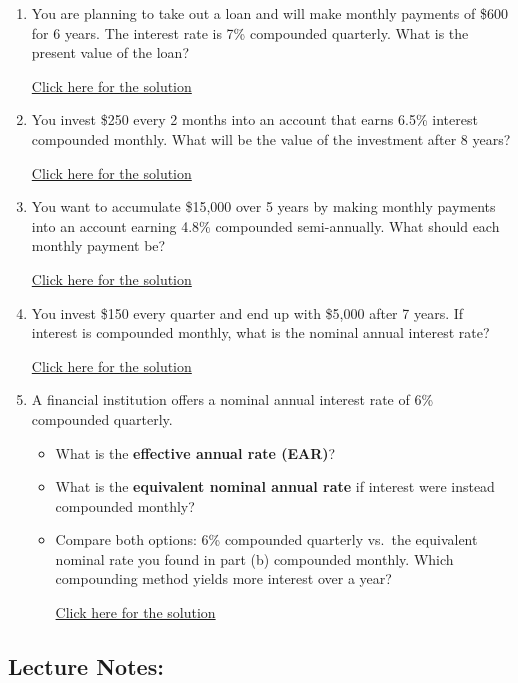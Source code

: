 \documentclass[
]{book}
\providecommand{\tightlist}{%
  \setlength{\itemsep}{0pt}\setlength{\parskip}{0pt}}
\begin{document}
\begin{enumerate}
\def\labelenumi{\arabic{enumi}.}
\tightlist
\item
  You are planning to take out a loan and will make monthly payments of \$600 for 6 years. The interest rate is 7\% compounded quarterly. What is the present value of the loan?

  \href{https://youtu.be/LudOJKtJSTU}{Click here for the solution}
\item
  You invest \$250 every 2 months into an account that earns 6.5\% interest compounded monthly. What will be the value of the investment after 8 years?

  \href{https://youtu.be/rjgtfe-PjDs}{Click here for the solution}
\item
  You want to accumulate \$15,000 over 5 years by making monthly payments into an account earning 4.8\% compounded semi-annually. What should each monthly payment be?

  \href{https://youtu.be/__aieU0ELCs}{Click here for the solution}
\item
  You invest \$150 every quarter and end up with \$5,000 after 7 years. If interest is compounded monthly, what is the nominal annual interest rate?

  \href{https://youtu.be/as5FICA8nLQ}{Click here for the solution}
\item
  A financial institution offers a nominal annual interest rate of 6\% compounded quarterly.

  \begin{itemize}
  \tightlist
  \item
    What is the \textbf{effective annual rate (EAR)}?
  \item
    What is the \textbf{equivalent nominal annual rate} if interest were instead compounded monthly?
  \item
    Compare both options: 6\% compounded quarterly vs.~the equivalent nominal rate you found in part (b) compounded monthly. Which compounding method yields more interest over a year?

    \href{https://youtu.be/cNuDhyZxDnQ}{Click here for the solution}
  \end{itemize}
\end{enumerate}

\subsection*{Lecture Notes:}\label{lecture-notes-16}
\end{document}
